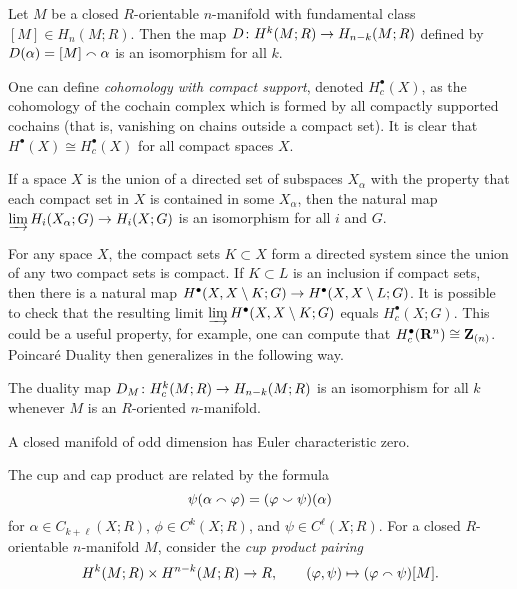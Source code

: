 \begin{theorem}
  Let $M$ be a closed $R$-orientable $n$-manifold with fundamental class $[M] \in H_n(M;R)$. Then the map $D \colon H^k(M;R) \rightarrow H_{n-k}(M;R)$ defined by $D(\alpha) = [M] \smallfrown \alpha$ is an isomorphism for all $k$.
\end{theorem}

One can define \emph{cohomology with compact support}, denoted $H_c^\bullet(X)$, as the cohomology of the cochain complex which is formed by all compactly supported cochains (that is, vanishing on chains outside a compact set). It is clear that $H^\bullet(X) \cong H^\bullet_c(X)$ for all compact spaces $X$.

\begin{proposition}
  If a space $X$ is the union of a directed set of subspaces $X_\alpha$ with the property that each compact set in $X$ is contained in some $X_\alpha$, then the natural map $\varinjlim H_i(X_\alpha;G) \rightarrow H_i(X;G)$ is an isomorphism for all $i$ and $G$.
\end{proposition}

For any space $X$, the compact sets $K \subset X$ form a directed system since the union of any two compact sets is compact. If $K \subset L$ is an inclusion if compact sets, then there is a natural map $H^\bullet(X, X \setminus K; G) \rightarrow H^\bullet(X, X \setminus L; G)$. It is possible to check that the resulting limit $\varinjlim H^\bullet(X, X \setminus K; G)$ equals $H^\bullet_c(X; G)$. This could be a useful property, for example, one can compute that $H^\bullet_c(\mathbf{R}^n) \cong \mathbf{Z}_{(n)}$. Poincar\'e Duality then generalizes in the following way.

\begin{theorem}
  The duality map $D_M \colon H_c^k(M;R) \rightarrow H_{n-k}(M;R)$ is an isomorphism for all $k$ whenever $M$ is an $R$-oriented $n$-manifold.
\end{theorem}

\begin{corollary}
  A closed manifold of odd dimension has Euler characteristic zero.
\end{corollary}

The cup and cap product are related by the formula
\[
\psi(\alpha \smallfrown \varphi) = (\varphi \smallsmile \psi)(\alpha)
\]
for $\alpha \in C_{k+\ell}(X;R)$, $\phi \in C^k(X;R)$, and $\psi \in C^\ell(X;R)$. For a closed $R$-orientable $n$-manifold $M$, consider the \emph{cup product pairing}
\[
H^k(M;R) \times H^{n-k}(M;R) \rightarrow R, \qquad
(\varphi,\psi) \mapsto (\varphi \smallfrown \psi)[M].
\]

